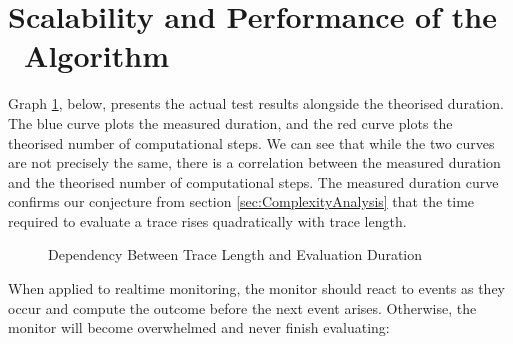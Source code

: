 \section{Scalability and Performance of the \RH\ Algorithm}
\label{sec:ScalabilityOfRosuHavelund}

Graph \ref{tab:StandardRHEvaluationDuration}, below, presents the actual test results alongside the theorised duration.  The blue curve plots the measured duration, and the red curve plots the theorised number of computational steps.  We can see that while the two curves are not precisely the same, there is a correlation between the measured duration and the theorised number of computational steps.  The measured duration curve confirms our conjecture from section \ref{sec:ComplexityAnalysis} that the time required to evaluate a trace rises quadratically with trace length.

\begin{figure}[h!]
	\centering
	\caption{Dependency Between Trace Length and Evaluation Duration}
	\label{tab:StandardRHEvaluationDuration}
\end{figure}

When applied to realtime monitoring, the monitor should react to events as they occur and compute the outcome before the next event arises.  Otherwise, the monitor will become overwhelmed and never finish evaluating:\\

